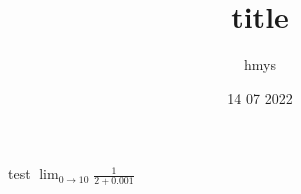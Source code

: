 \title{title}
\author{hmys}
\date{14 07 2022}

\maketitle

\par
test $\lim_{0 \to 10} \frac{1}{2 + 0.001}$

